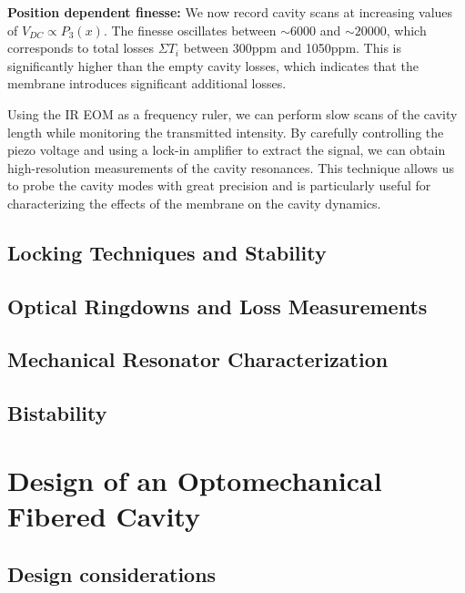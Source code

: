 \noindent \textbf{Position dependent finesse: } We now record cavity scans at increasing values of $V_{DC}\propto P_3(x)$. The finesse oscillates between $\sim 6000$ and $\sim 20000$, which corresponds to total losses $\Sigma T_i$ between 300ppm and 1050ppm. This is significantly higher than the empty cavity losses, which indicates that the membrane introduces significant additional losses. 

Using the IR EOM as a frequency ruler, we can perform slow scans of the cavity length while monitoring the transmitted intensity. By carefully controlling the piezo voltage and using a lock-in amplifier to extract the signal, we can obtain high-resolution measurements of the cavity resonances. This technique allows us to probe the cavity modes with great precision and is particularly useful for characterizing the effects of the membrane on the cavity dynamics.
\subsection{Locking Techniques and Stability}
\subsection{Optical Ringdowns and Loss Measurements}
\subsection{Mechanical Resonator Characterization}
\subsection{Bistability}

\section{Design of an Optomechanical Fibered Cavity}
\subsection{Design considerations}

\vspace{-\baselineskip}

